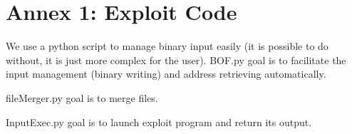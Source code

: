 \documentclass[a4paper, 11pt]{article}
\begin{document}
\clearpage 
\appendix
\section{Annex 1: Exploit Code}


We use a python script to manage binary input easily (it is possible to do without, it is just more complex for the user). 
BOF.py goal is to facilitate the input management (binary writing) and address retrieving automatically.

fileMerger.py goal is to merge files.

InputExec.py goal is to launch exploit program and return its output.

\end{document}
